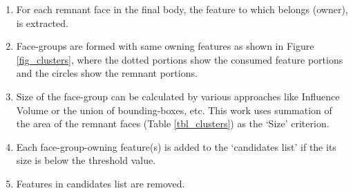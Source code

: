 \begin{enumerate}
[noitemsep,topsep=2pt,parsep=2pt,partopsep=2pt]

\item For each remnant face in the final body, the feature to which belongs (owner), is extracted.
\item  Face-groups are formed with same owning features as shown in Figure \ref{fig_clusters}, where the dotted portions show the consumed feature portions and the circles show the remnant portions. 
\item Size of the face-group can be calculated by various approaches like Influence Volume \cite{SangHunLee2005} or the union of bounding-boxes, etc. This work uses summation of the area of the remnant faces (Table \ref{tbl_clusters}) as the `Size' criterion. 
\item Each face-group-owning feature(s) is added to the `candidates list'  if the its size is below the threshold value.
\item Features in candidates list are removed.
\end{enumerate}


